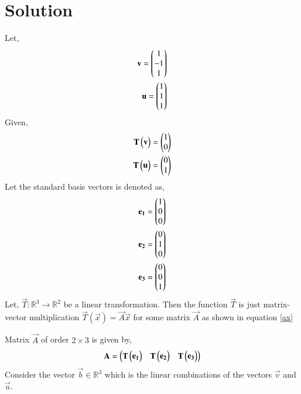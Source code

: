 \documentclass[journal,12pt,twocolumn]{IEEEtran}
\begin{document}
\section{Solution}
Let,
\begin{align}
    \mathbf{v}=\begin{pmatrix}1\\-1\\1\end{pmatrix}\\
    \mathbf{u}=\begin{pmatrix}1\\1\\1\end{pmatrix}
\end{align}
Given,
\begin{align}
    \mathbf{T}\begin{pmatrix}\mathbf{v}\end{pmatrix}=\begin{pmatrix}1\\0\end{pmatrix}\\
    \mathbf{T}\begin{pmatrix}\mathbf{u}\end{pmatrix}=\begin{pmatrix}0\\1\end{pmatrix}
\end{align}
Let the standard basis vectors is denoted as, 
\begin{align}
    \mathbf{e_1}&=\begin{pmatrix}1\\0\\0\end{pmatrix}\\
    \mathbf{e_2}&=\begin{pmatrix}0\\1\\0\end{pmatrix}\\
    \mathbf{e_3}&=\begin{pmatrix}0\\0\\1\end{pmatrix}
\end{align}
Let, 
$\vec{T} :\mathbb{R}^3 \rightarrow  \mathbb{R}^2$ be a linear transformation. Then the function $\vec{T}$ is just matrix-vector multiplication $\vec{T}(\vec{x}) = \vec{A}\vec{x}$ for some matrix $\vec{A}$ as shown in equation \eqref{ax}

Matrix $\vec{A}$ of order $2 \times 3$ is given by,
\begin{align}
    \mathbf{A}=\begin{pmatrix}\mathbf{T}\begin{pmatrix}\mathbf{e_1}\end{pmatrix} & \mathbf{T}\begin{pmatrix}\mathbf{e_2}\end{pmatrix} & \mathbf{T}\begin{pmatrix}\mathbf{e_3}\end{pmatrix}\end{pmatrix}\label{A}
\end{align}
Consider the vector $\vec{b} \in \mathbb{R}^3$ which is the linear combinations of the vectors $\vec{v}$ and $\vec{u}$.
\end{document}
